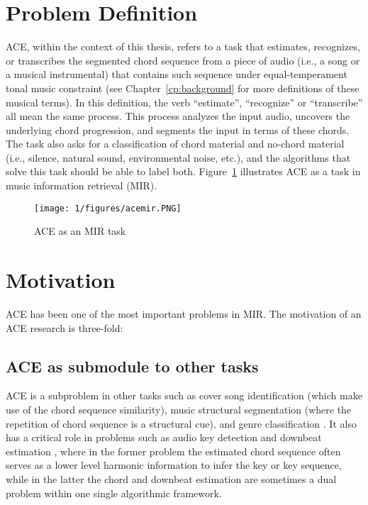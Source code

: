 \section{Problem Definition} \label{sec:1-problemdef}
ACE, within the context of this thesis, refers to a task that estimates, recognizes, or transcribes the segmented chord sequence from a piece of audio (i.e., a song or a musical instrumental) that contains such sequence under equal-temperament tonal music constraint (see Chapter~\ref{cp:background} for more definitions of these musical terms). In this definition, the verb ``estimate'', ``recognize'' or ``transcribe'' all mean the same process. This process analyzes the input audio, uncovers the underlying chord progression, and segments the input in terms of these chords. The task also asks for a classification of chord material and no-chord material (i.e., silence, natural sound, environmental noise, etc.), and the algorithms that solve this task should be able to label both. Figure~\ref{fig:1-acemir} illustrates ACE as a task in music information retrieval (MIR).
\begin{figure}[h]
\centering
\texttt{[image: 1/figures/acemir.PNG]}
\caption{ACE as an MIR task}
\label{fig:1-acemir}
\end{figure}

\section{Motivation} \label{sec:1-moti}
ACE has been one of the most important problems in MIR. The motivation of an ACE research is three-fold:

\subsection{ACE as submodule to other tasks}
ACE is a subproblem in other tasks such as cover song identification \cite{bello2007audio,lee2006identifying,serra2010audio} (which make use of the chord sequence similarity), music structural segmentation \cite{bello2005robust} (where the repetition of chord sequence is a structural cue), and genre classification \cite{cheng2008automatic,perez2009genre}. It also has a critical role in problems such as audio key detection \cite{papadopoulos2012modeling,pauwels2010integrating} and downbeat estimation \cite{papadopoulos2008simultaneous,mauch2010simultaneous}, where in the former problem the estimated chord sequence often serves as a lower level harmonic information to infer the key or key sequence, while in the latter the chord and downbeat estimation are sometimes a dual problem within one single algorithmic framework.

